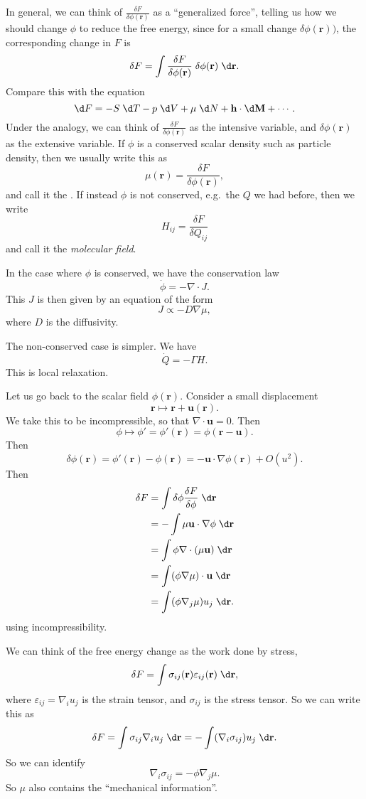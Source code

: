 \documentclass[a4paper]{article}
\begin{document}
In general, we can think of $\frac{\delta F}{\delta \phi(\mathbf{r})}$ as a ``generalized force'', telling us how we should change $\phi$ to reduce the free energy, since for a small change $\delta \phi(\mathbf{r}))$, the corresponding change in $F$ is
\[
  \delta F = \int \frac{\delta F}{\delta \phi(\mathbf{r})} \;\delta \phi(\mathbf{r})\;\d \mathbf{r}.
\]
Compare this with the equation 
\[
  \d F = - S \;\d T - p \;\d V + \mu \;\d N + \mathbf{h} \cdot \d \mathbf{M} + \cdots.
\]
Under the analogy, we can think of $\frac{\delta F}{\delta \phi(\mathbf{r})}$ as the intensive variable, and $\delta \phi(\mathbf{r})$ as the extensive variable. If $\phi$ is a conserved scalar density such as particle density, then we usually write this as
\[
  \mu(\mathbf{r}) = \frac{\delta F}{\delta \phi(\mathbf{r})},
\]
and call it the . If instead $\phi$ is not conserved, e.g.\ the $Q$ we had before, then we write
\[
  H_{ij} = \frac{\delta F}{\delta Q_{ij}}
\]
and call it the \emph{molecular field}.

In the case where $\phi$ is conserved, we have the conservation law
\[
  \dot{\phi} = - \nabla \cdot J.
\]
This $J$ is then given by an equation of the form
\[
  J \propto -D \nabla \mu,
\]
where $D$ is the diffusivity.

The non-conserved case is simpler. We have
\[
  \dot{Q} = - \Gamma H.
\]
This is local relaxation.

Let us go back to the scalar field $\phi(\mathbf{r})$. Consider a small displacement
\[
  \mathbf{r} \mapsto \mathbf{r} + \mathbf{u}(\mathbf{r}).
\]
We take this to be incompressible, so that $\nabla \cdot \mathbf{u} = 0$. Then
\[
  \phi \mapsto \phi' = \phi'(\mathbf{r}) = \phi(\mathbf{r} - \mathbf{u}).
\]
Then
\[
  \delta \phi(\mathbf{r}) = \phi'(\mathbf{r}) - \phi(\mathbf{r}) = - \mathbf{u} \cdot \nabla \phi(\mathbf{r}) + O(u^2).
\]
Then
\begin{align*}
  \delta F &= \int \delta \phi \frac{\delta F}{\delta \phi}\;\d \mathbf{r} \\
  &= -\int \mu \mathbf{u} \cdot \nabla \phi \;\d \mathbf{r}\\
  &= \int \phi \nabla \cdot (\mu \mathbf{u})\;\d \mathbf{r}\\
  &= \int (\phi \nabla \mu)\cdot \mathbf{u}\;\d \mathbf{r}\\
  &= \int (\phi \nabla_j \mu)u_j\;\d \mathbf{r}.
\end{align*}
using incompressibility.

We can think of the free energy change as the work done by stress,
\[
  \delta F = \int \sigma_{ij}(\mathbf{r}) \varepsilon_{ij}(\mathbf{r})\;\d \mathbf{r},
\]
where $\varepsilon_{ij} = \nabla_i u_j$ is the strain tensor, and $\sigma_{ij}$ is the stress tensor. So we can write this as
\[
  \delta F = \int \sigma_{ij} \nabla_i u_j\;\d \mathbf{r} = - \int (\nabla_i \sigma_{ij}) u_j\;\d \mathbf{r}.
\]
So we can identify
\[
  \nabla_i \sigma_{ij} = -\phi \nabla_j \mu.
\]
So $\mu$ also contains the ``mechanical information''.
\end{document}
